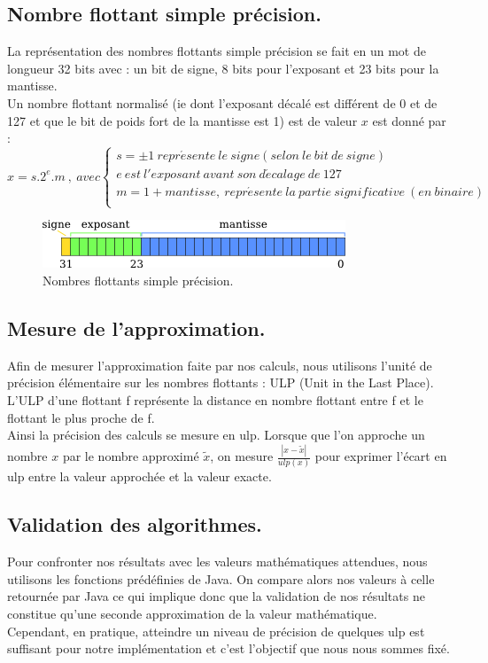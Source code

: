\documentclass[a4,12pt]{article}
\begin{document}
\subsection{Nombre flottant simple précision.}
La représentation des nombres flottants simple précision se fait en un mot de longueur 32 bits avec : un bit de signe, 8 bits pour l'exposant et 23 bits pour la mantisse.\\
Un nombre flottant normalisé (ie dont l'exposant décalé est différent de 0 et de 127 et que le bit de poids fort de la mantisse est 1) est de valeur $x$ est donné par : \\
$$ x = s.2^{e}.m\ ,\ avec
 \left \{
    \begin{array}{l}
    s = \pm 1\ repr\acute esente\ le\ signe (selon\ le\ bit\ de\ signe)\\
    e\ est\ l'exposant\ avant\ son\ d\acute ecalage\ de\ 127\\
    m = 1 + mantisse,\ repr\acute esente\ la\ partie\ significative\ (en\ binaire)\\
    \end{array}
\right.
$$
\begin{figure}[b]
    \centering
    \includegraphics{float.png}
    \caption{Nombres flottants simple précision.}
    \label{Représentation des nombres flottants simple précision.}
\end{figure}

\subsection{Mesure de l'approximation.}
Afin de mesurer l'approximation faite par nos calculs, nous utilisons l'unité de précision élémentaire sur les nombres flottants : ULP (Unit in the Last Place). L'ULP d'une flottant f représente la distance en nombre flottant entre f et le flottant le plus proche de f.\\
Ainsi la précision des calculs se mesure en ulp. Lorsque que l'on approche un nombre $x$ par le nombre approximé $\tilde x$, on mesure $ \frac{|x - \tilde x|}{ulp(x)} $ pour exprimer l'écart en ulp entre la valeur approchée et la valeur exacte.

\subsection{Validation des algorithmes.}
Pour confronter nos résultats avec les valeurs mathématiques attendues, nous utilisons les fonctions prédéfinies de Java. On compare alors nos valeurs à celle retournée par Java ce qui implique donc que la validation de nos résultats ne constitue qu'une seconde approximation de la valeur mathématique.\\
Cependant, en pratique, atteindre un niveau de précision de quelques ulp est suffisant pour notre implémentation et c'est l'objectif que nous nous sommes fixé.
\end{document}
